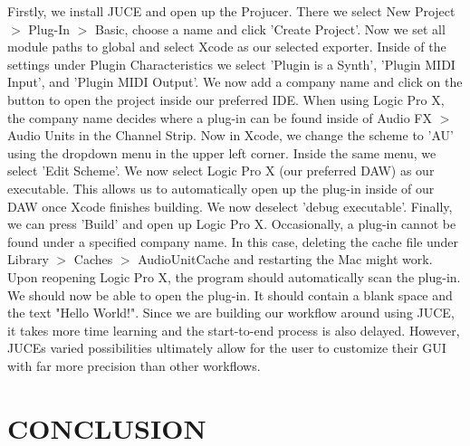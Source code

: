 \documentclass{aes2e}
\begin{document}
Firstly, we install JUCE \cite{JUCE2021} and open up the Projucer. There we select New Project $>$ Plug-In $>$ Basic, choose a name and click 'Create Project'.
Now we set all module paths to global and select Xcode as our selected exporter. 
Inside of the settings under Plugin Characteristics we select 'Plugin is a Synth', 'Plugin MIDI Input', and 'Plugin MIDI Output'. We now add a company name and click on the button to open the project inside our preferred IDE.
When using Logic Pro X, the company name decides where a plug-in can be found inside of Audio FX $>$ Audio Units in the Channel Strip.
Now in Xcode, we change the scheme to 'AU' using the dropdown menu in the upper left corner. Inside the same menu, we select 'Edit Scheme'. We now select Logic Pro X (our preferred DAW) as our executable. This allows us to automatically open up the plug-in inside of our DAW once Xcode finishes building. We now deselect 'debug executable'.
Finally, we can press 'Build' and open up Logic Pro X. Occasionally, a plug-in cannot be found under a specified company name. In this case, deleting the cache file under Library $>$ Caches $>$ AudioUnitCache and restarting the Mac might work. Upon reopening Logic Pro X, the program should automatically scan the plug-in.
We should now be able to open the plug-in. It should contain a blank space and the text "Hello World!".
Since we are building our workflow around using JUCE, it takes more time learning and the start-to-end process is also delayed. However, JUCEs varied possibilities ultimately allow for the user to customize their GUI with far more precision than other workflows.

\section{CONCLUSION}
\end{document}
